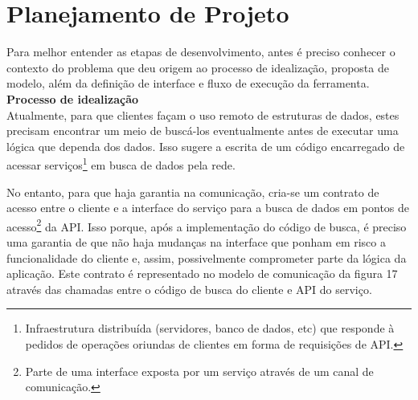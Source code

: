\section{Planejamento de Projeto}

Para melhor entender as etapas de desenvolvimento, antes é preciso conhecer o contexto do problema que deu origem ao processo de idealização, proposta de modelo, além da definição de interface e fluxo de execução da ferramenta. \\

\textbf{Processo de idealização} \\

Atualmente, para que clientes façam o uso remoto de estruturas de dados, estes precisam encontrar um meio de buscá-los eventualmente antes de executar uma lógica que dependa dos dados. Isso sugere a escrita de um código encarregado de acessar serviços\footnote{
  Infraestrutura distribuída (servidores, banco de dados, etc) que responde à pedidos de operações oriundas de clientes em forma de requisições de API.
} em busca de dados pela rede.

No entanto, para que haja garantia na comunicação, cria-se um contrato de acesso entre o cliente e a interface do serviço para a busca de dados em pontos de acesso\footnote{
  Parte de uma interface exposta por um serviço através de um canal de comunicação.
} da API. Isso porque, após a implementação do código de busca, é preciso uma garantia de que não haja mudanças na interface que ponham em risco a funcionalidade do cliente e, assim, possivelmente comprometer parte da lógica da aplicação. Este contrato é representado no modelo de comunicação da figura 17 através das chamadas entre o código de busca do cliente e API do serviço.

